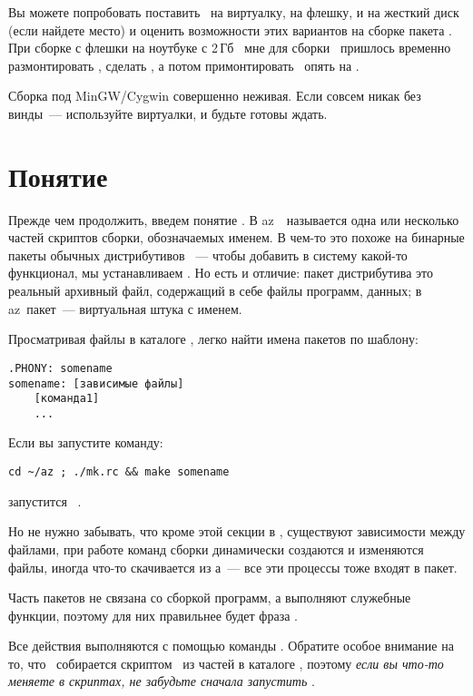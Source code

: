 Вы можете попробовать поставить \linux\ на виртуалку, на флешку, и на жесткий
диск (если найдете место) и оценить возможности этих вариантов на сборке пакета
. При сборке с флешки на ноутбуке с 2\,Гб \ram\ мне для сборки
\ пришлось временно размонтировать , сделать
, а потом примонтировать \
опять на .

Сборка под MinGW/Cygwin совершенно неживая. Если совсем никак без винды\ ---
используйте виртуалки, и будьте готовы ждать.

\section{Понятие }

Прежде чем продолжить, введем понятие . В az\linux\ \
называется одна или несколько частей скриптов сборки, обозначаемых именем. В
чем-то это похоже на бинарные пакеты обычных дистрибутивов \linux\ --- чтобы
добавить в систему какой-то функционал, мы устанавливаем .
Но есть и отличие: пакет дистрибутива это реальный архивный файл, содержащий в
себе файлы программ, данных; в az\linux\ пакет\ --- виртуальная штука с именем.

Просматривая файлы в каталоге \file{mk/}, легко найти имена пакетов по шаблону:

\begin{verbatim}
.PHONY: somename
somename: [зависимые файлы]
    [команда1]
    ...
\end{verbatim}

Если вы запустите команду:

\begin{verbatim}
cd ~/az ; ./mk.rc && make somename
\end{verbatim}

запустится \ .

Но не нужно забывать, что кроме этой секции в , существуют зависимости
между файлами, при работе команд сборки динамически создаются и изменяются
файлы, иногда что-то скачивается из \internet а\ --- все эти процессы тоже
входят в пакет.

\bigskip
Часть пакетов не связана со сборкой программ, а выполняют служебные функции,
поэтому для них правильнее будет фраза .

\bigskip
Все действия выполняются с помощью команды . Обратите особое
внимание на то, что \ собирается скриптом \ из частей
в каталоге \file{mk/}, поэтому \emph{если вы что-то меняете в скриптах, не
забудьте сначала запустить \prog{./mk.rc}}.

